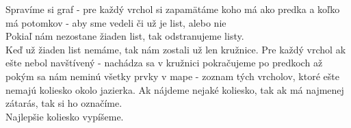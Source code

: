 \documentclass[a4paper,11pt]{article}
\begin{document}
Spravíme si graf - pre každý vrchol si zapamätáme koho má ako predka a koľko má potomkov - aby sme vedeli či už je list, alebo nie\\

Pokiaľ nám nezostane žiaden list, tak odstranujeme listy.\\
Keď už žiaden list nemáme, tak nám zostali už len kružnice. Pre každý vrchol ak ešte nebol navštívený - nachádza sa v kružnici pokračujeme po predkoch až pokým sa nám neminú všetky prvky v mape - zoznam tých vrcholov, ktoré ešte nemajú koliesko okolo jazierka. Ak nájdeme nejaké koliesko, tak ak má najmenej zátarás, tak si ho označíme.\\
Najlepšie koliesko vypíšeme.




 
\end{document}
